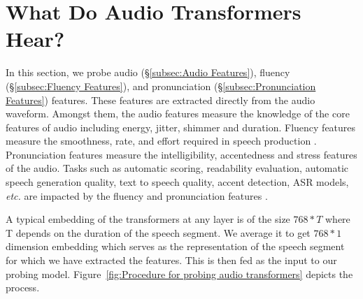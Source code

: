 \documentclass[sigconf]{acmart}
\newcommand{\wv}{wav2vec2.0\xspace}
\newcommand{\mj}{Mockingjay\xspace}
\begin{document}

\section{What Do Audio Transformers Hear?}
\label{sec:What Do Audio Transformers Hear?}


In this section, we probe audio (\S\ref{subsec:Audio Features}), fluency (\S\ref{subsec:Fluency Features}), and pronunciation (\S\ref{subsec:Pronunciation Features}) features. These features are extracted directly from the audio waveform. Amongst them, the audio features measure the knowledge of the core features of audio including energy, jitter, shimmer and duration. Fluency features measure the smoothness, rate, and effort required in speech production \cite{de2009praat,yan2018complexity}. Pronunciation features measure the intelligibility, accentedness and stress features of the audio. Tasks such as automatic scoring, readability evaluation, automatic speech generation quality, text to speech quality, accent detection, ASR models, \textit{etc.} are impacted by the fluency and pronunciation features \cite{yan2018complexity,barth2014effects,rasinski2004assessing,zhang2019learning,lee2019robust,kyriakopoulos2020automatic,jyothi2015improved}. 

A typical embedding of the transformers at any layer is of the size $768*T$ where T depends on the duration of the speech segment. We average it to get $768*1$ dimension embedding which serves as the representation of the speech segment for which we have extracted the features. This is then fed as the input to our probing model. Figure~\ref{fig:Procedure for probing audio transformers} depicts the process.

\end{document}
